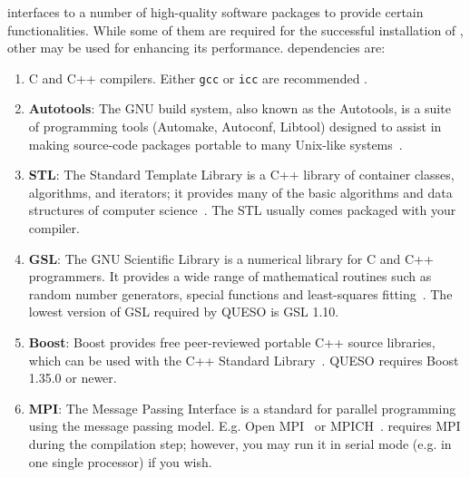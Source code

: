 \Queso{} interfaces to a number of high-quality software packages to provide certain functionalities. While some of them are required for the successful installation of \Queso{}, other may be used for enhancing its performance.
%
\Queso{} dependencies are:
\begin{enumerate}%

  \item C and C++ compilers. Either \texttt{gcc} or \texttt{icc} are recommended \cite{GCC,ICC}.

  \item \textbf{Autotools}: The GNU build system, also known as the Autotools, is a suite of programming tools (Automake, Autoconf, Libtool) designed to assist in making source-code packages portable to many Unix-like systems~\cite{Autotools}.

  \item \textbf{STL}: The Standard Template Library is a C++ library of container classes, algorithms, and iterators; it provides many of the basic algorithms and data structures of computer science~\cite{STL}. The STL usually comes packaged with your compiler.

  \item \textbf{GSL}: The GNU Scientific Library is a numerical library for C and C++ programmers. It provides a wide range of mathematical routines such as random number generators, special functions and least-squares fitting~\cite{Gsl}. The lowest version of GSL required by QUESO is GSL 1.10.

  \item \textbf{Boost}: Boost provides free peer-reviewed portable C++ source libraries, which can be used with the C++ Standard Library~\cite{Boost}. QUESO requires Boost 1.35.0 or newer.

  \item \textbf{MPI}: The Message Passing Interface is a standard for parallel programming using the message passing model. E.g. Open MPI~\cite{Openmpi} or MPICH~\cite{Mpich}. \Queso{} requires MPI during the compilation step; however, you may run it in serial mode (e.g. in one single processor) if you wish. %

\end{enumerate}%

%


